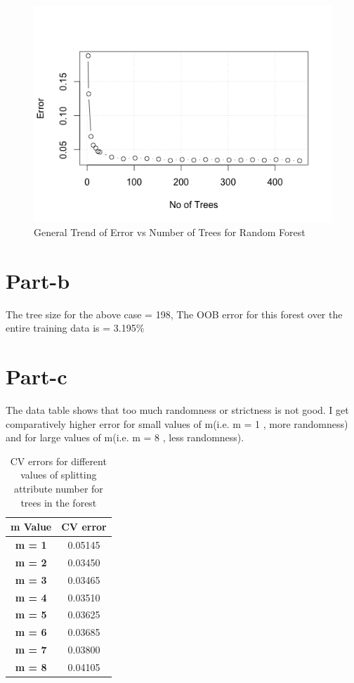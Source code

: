 \documentclass[12pt]{article}%
\begin{document}
\begin{figure}
\includegraphics{part1.png}
\caption{General Trend of Error vs Number of Trees for Random Forest}
\end{figure}


\section{Part-b}
The tree size for the above case = 198, The OOB error for this forest over the entire training data is = 3.195\%

\section{Part-c}

The data table shows that too much randomness or strictness is not good. I get comparatively higher error for small values of m(i.e. m = 1 , more randomness) and for large values of m(i.e. m = 8 , less randomness).


\begin{table}[!h]
\begin{center}

\begin{tabular}{|c|c|}
\hline
{\bf m Value} & {\bf  CV error }\\ \hline
 {\bf m = 1 } &  0.05145\\ \hline
 {\bf m = 2 } &  0.03450\\ \hline
 {\bf m = 3 } &  0.03465\\ \hline
 {\bf m = 4 } &  0.03510\\ \hline
 {\bf m = 5 } &  0.03625\\ \hline
 {\bf m = 6 } &  0.03685\\ \hline
 {\bf m = 7 } &  0.03800\\ \hline
 {\bf m = 8 } &  0.04105\\ \hline

\end{tabular}

\caption{CV errors for different values of splitting attribute number for trees in the forest}
\end{center}
\end{table}
\end{document}
